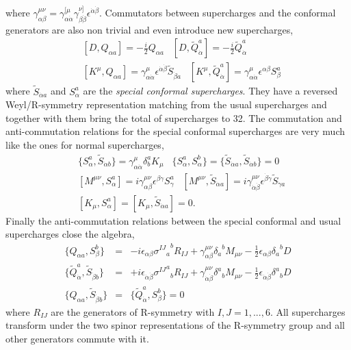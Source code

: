 where $\gamma_{\alpha\beta}^{\mu\nu} = \gamma^{[\mu}_{\alpha\dot{\alpha}} \gamma^{\nu]}_{\beta\dot{\beta}} \epsilon^{\dot{\alpha}\dot{\beta}}$. Commutators between supercharges and the conformal generators are also non trivial and even introduce new supercharges,
\begin{eqnarray}
	& [D, Q_{\alpha a}] = -\frac{i}{2} Q_{\alpha a} \; \; \; [D, \tilde{Q}_{\dot{\alpha}}^a] = -\frac{i}{2} \tilde{Q}_{\dot{\alpha}}^a \nonumber \\
	& [K^\mu,  Q_{\alpha a}] = \gamma^\mu_{\alpha\dot{\alpha}} \epsilon^{\dot{\alpha} \dot{\beta}} \tilde{S}_{\dot{\beta} a} \; \; \; [K^\mu, \tilde{Q}_{\dot{\alpha}}^a] = \gamma^\mu_{\alpha\dot{\alpha}} \epsilon^{\alpha\beta} S_\beta^a
	\label{eq:dq_commutators}
\end{eqnarray}
where $\tilde{S}_{\dot{\alpha} a}$ and $S_\alpha^a$ are the \emph{special conformal supercharges}. They have a reversed Weyl/R-symmetry representation matching from the usual supercharges and together with them bring the total of supercharges to 32. The commutation and anti-commutation relations for the special conformal supercharges are very much like the ones for normal supercharges,
\begin{eqnarray}
	& \{S_{\alpha}^a, \tilde{S}_{\dot{\alpha} b}\} = \gamma^\mu_{\alpha\dot{\alpha}} \delta_b^a K_\mu \; \; \; \{S_{\alpha}^a, S_{\alpha}^b\} = \{ \tilde{S}_{\dot{\alpha} a}, \tilde{S}_{\dot{\alpha} b} \} = 0 \nonumber\\
	& [M^{\mu\nu}, S_{\alpha}^a] = i \gamma^{\mu\nu}_{\alpha\beta} \epsilon^{\beta\gamma} S_{\gamma}^a \; \; \; [M^{\mu\nu}, \tilde{S}_{\dot{\alpha} a}] = i \gamma^{\mu\nu}_{\dot{\alpha}\dot{\beta}} \epsilon^{\dot{\beta}\dot{\gamma}} \tilde{S}_{\dot{\gamma} a} \nonumber \\
	& [K_\mu, S_{\alpha}^a] = [K_\mu, \tilde{S}_{\dot{\alpha} a}] = 0.
\end{eqnarray} 
Finally the anti-commutation relations between the special conformal and usual supercharges close the algebra,
\begin{eqnarray}
	\{ Q_{\alpha a}, S_\beta^b \} & = & - i \epsilon_{\alpha\beta} {{\sigma^{IJ}}_a}^b R_{IJ} + \gamma_{\alpha\beta}^{\mu\nu} {\delta_a}^b M_{\mu\nu} - \frac{1}{2} \epsilon_{\alpha\beta} {\delta_a}^b D \nonumber \\
	\{ \tilde{Q}_{\dot{\alpha}}^a, \tilde{S}_{\dot{\beta} b} \} & = & + i \epsilon_{\dot{\alpha}\dot{\beta}} {{\sigma^{IJ}}^a}_b R_{IJ} + \gamma_{\dot{\alpha}\dot{\beta}}^{\mu\nu} {\delta^a}_b M_{\mu\nu} - \frac{1}{2} \epsilon_{\dot{\alpha}\dot{\beta}} {\delta^a}_b D \nonumber \\
	\{ Q_{\alpha a}, \tilde{S}_{\dot{\beta} b} \} & = & \{ \tilde{Q}_{\dot{\alpha}}^a, S_\beta^b \} = 0
	\label{eq:qs_anticommutators}
\end{eqnarray}
where $R_{IJ}$ are the generators of R-symmetry with $I,J = 1, ..., 6$. All supercharges transform under the two spinor representations of the R-symmetry group and all other generators commute with it. 

